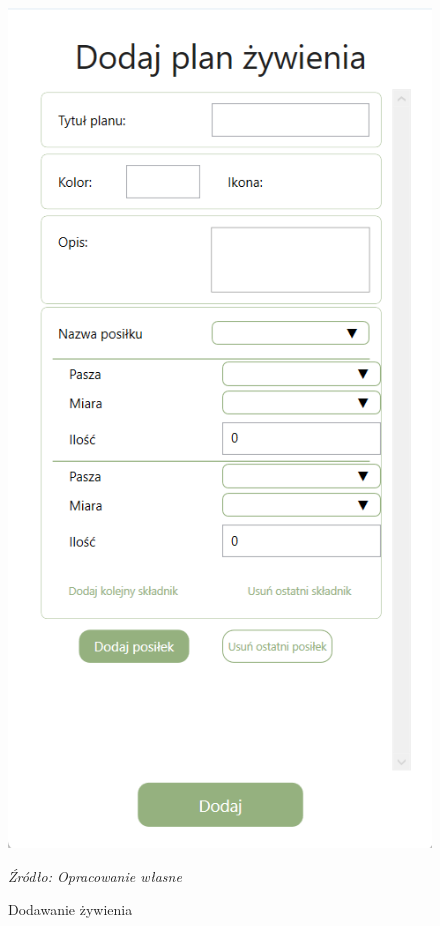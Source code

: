 \documentclass[12pt,oneside]{report}
\begin{document}
\begin{figure} [H]
	\begin{center}
		\begin{minipage}{6cm}
			\centering
			\includegraphics[scale=0.7]{dodajZywienie}
			\caption{Dodawanie żywienia}
			\textit{Źródło: Opracowanie własne}
			\label{DodajZywienie}
		\end{minipage}

\end{center}
\end{figure}
\end{document}
